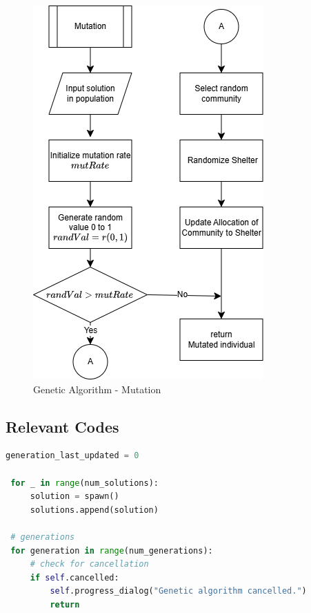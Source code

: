 \begin{appendices}
\begin{centerappendixtitle}
		\begin{figure}[h]
			\centering
			\caption{Genetic Algorithm - Mutation}
			\label{mutateFlow}
			\includegraphics[scale=0.7]{appendix/mutate f}
		\end{figure}
		
		
		
	\end{centerappendixtitle}
	
	\begin{centerappendixtitle}
		\chapter{Relevant Codes}
		\pagebreak
		
		
		\begin{lstlisting}[language=Python, caption={Genetic Algorithm}, label={genalgoCode}, breaklines=true]
 generation_last_updated = 0

 for _ in range(num_solutions):
     solution = spawn()
     solutions.append(solution)

 # generations
 for generation in range(num_generations):
     # check for cancellation
     if self.cancelled:
         self.progress_dialog("Genetic algorithm cancelled.")
         return


\end{lstlisting}
\end{centerappendixtitle}
\end{appendices}
